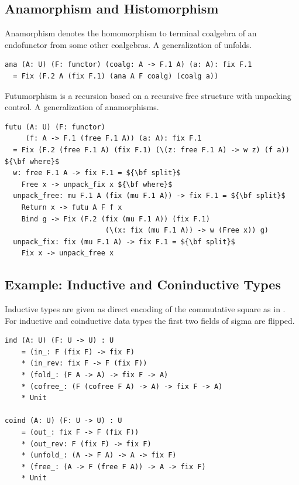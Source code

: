\documentclass{article}
\begin{document}
\subsection{Anamorphism and Histomorphism}

Anamorphism denotes the homomorphism to terminal coalgebra of an endofunctor
from some other coalgebras. A generalization of unfolds.

\begin{lstlisting}[mathescape=true]
ana (A: U) (F: functor) (coalg: A -> F.1 A) (a: A): fix F.1
  = Fix (F.2 A (fix F.1) (ana A F coalg) (coalg a))
\end{lstlisting}

Futumorphism is a recursion based on a recursive free structure with unpacking control.
A generalization of anamorphisms.

\begin{lstlisting}[mathescape=true]
futu (A: U) (F: functor)
     (f: A -> F.1 (free F.1 A)) (a: A): fix F.1
  = Fix (F.2 (free F.1 A) (fix F.1) (\(z: free F.1 A) -> w z) (f a)) ${\bf where}$
  w: free F.1 A -> fix F.1 = ${\bf split}$
    Free x -> unpack_fix x ${\bf where}$
  unpack_free: mu F.1 A (fix (mu F.1 A)) -> fix F.1 = ${\bf split}$
    Return x -> futu A F f x
    Bind g -> Fix (F.2 (fix (mu F.1 A)) (fix F.1)
                        (\(x: fix (mu F.1 A)) -> w (Free x)) g)
  unpack_fix: fix (mu F.1 A) -> fix F.1 = ${\bf split}$
    Fix x -> unpack_free x
\end{lstlisting}

\subsection{Example: Inductive and Coninductive Types}

Inductive types are given as direct encoding of the commutative square as in \cite{Wu13}.
For inductive and coinductive data types the first two fields of sigma are flipped.

\begin{lstlisting}[mathescape=true]
ind (A: U) (F: U -> U) : U
    = (in_: F (fix F) -> fix F)
    * (in_rev: fix F -> F (fix F))
    * (fold_: (F A -> A) -> fix F -> A)
    * (cofree_: (F (cofree F A) -> A) -> fix F -> A)
    * Unit

coind (A: U) (F: U -> U) : U
    = (out_: fix F -> F (fix F))
    * (out_rev: F (fix F) -> fix F)
    * (unfold_: (A -> F A) -> A -> fix F)
    * (free_: (A -> F (free F A)) -> A -> fix F)
    * Unit
\end{lstlisting}
\end{document}
